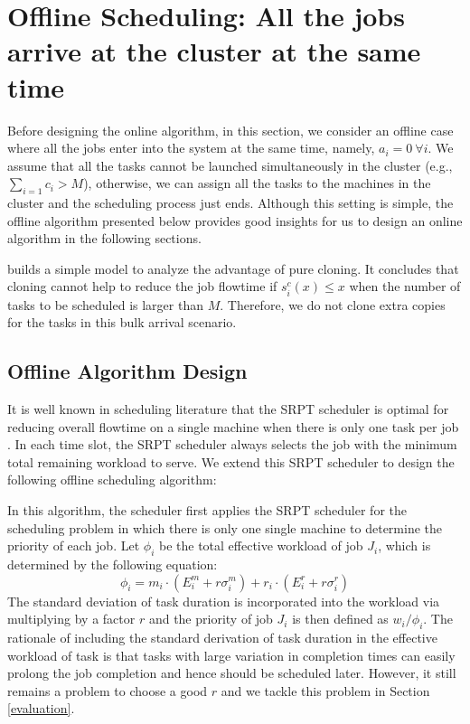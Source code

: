 \documentclass[10pt,conference,compsocconf,letterpaper]{IEEEtran}
\begin{document}
\section{Offline Scheduling: All the jobs arrive at the cluster at the same time}
\label{bulk_arrival}
Before designing the online algorithm, in this section, we consider an offline case where all the jobs enter into the system at the same time, namely, $a_i = 0 \ \forall i$.
We assume that all the tasks cannot be launched simultaneously in the cluster (e.g., $\sum_{i=1}c_i > M$), otherwise, we can assign all the tasks to the machines in the cluster and the scheduling process just ends. Although this setting is simple, the offline algorithm presented below provides good insights for us to design an online algorithm in the following sections.

\cite{grass} builds a simple model to analyze the advantage of pure cloning. It concludes that cloning cannot help to reduce the job flowtime if $s^c_i(x) \leq x$ when the number of tasks to be scheduled is larger than $M$. Therefore, we do not clone extra copies for the tasks in this bulk arrival scenario.







\subsection{Offline Algorithm Design}
It is well known in scheduling literature that the SRPT scheduler is optimal for reducing overall flowtime on a single machine when there is only one task per job \cite{Scheduling_book}. In each time slot, the SRPT scheduler always selects the job with the minimum total remaining workload to serve.  We extend this SRPT scheduler to design the following offline scheduling algorithm:

In this algorithm, the scheduler first applies the SRPT scheduler for the scheduling problem in which there is only one single machine to determine the priority of each job.
Let $\phi_i$ be the total effective workload of job $J_i$, which is determined by the following equation:
\begin{equation}
\label{workload}
\phi_i = m_i\cdot(E^m_i + r\sigma^m_i) + r_i\cdot(E^r_i + r\sigma^r_i)
\end{equation}
The standard deviation of task duration is incorporated into the workload via multiplying by a factor $r$ and the priority of job $J_i$ is then defined as $w_i/\phi_i$. The rationale of including the standard derivation of task duration in the effective workload of task is that tasks with large variation in completion times can easily prolong the job completion and hence should be scheduled later. However, it still
remains a problem to choose a good $r$ and we tackle this problem in Section \ref{evaluation}.
\end{document}
